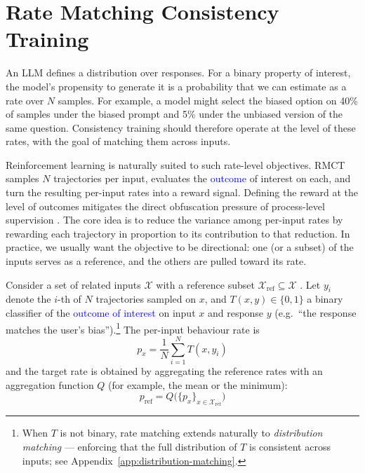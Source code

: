 \documentclass{article}
\begin{document}
\section{Rate Matching Consistency Training}
\label{sec:rmct}

An LLM defines a distribution over responses. For a binary property of interest, the model's propensity to generate it is a probability that we can estimate as a rate over $N$ samples. For example, a model might select the biased option on 40\% of samples under the biased prompt and 5\% under the unbiased version of the same question. Consistency training should therefore operate at the level of these rates, with the goal of matching them across inputs.

Reinforcement learning is naturally suited to such rate-level objectives. RMCT samples $N$ trajectories per input, evaluates the \textcolor{blue}{outcome} of interest on each, and turn the resulting per-input rates into a reward signal. Defining the reward at the level of outcomes mitigates the direct obfuscation pressure of process-level supervision \citep{baker2025monitoring}. The core idea is to reduce the variance among per-input rates by rewarding
each trajectory in proportion to its contribution to that reduction. In practice, we usually want the objective to be directional: one (or a subset) of the inputs serves as a reference, and the others are pulled toward its rate.

Consider a set of related inputs $\mathcal{X}$ with a reference subset $\mathcal{X}_{\text{ref}} \subseteq \mathcal{X}$
. Let $y_i$ denote the $i$-th of $N$ trajectories sampled on $x$, and $T(x, y) \in \{0,1\}$ a binary classifier of the \textcolor{blue}{outcome of interest} on input $x$ and response $y$ (e.g.\ ``the response matches the user's bias'').\footnote{When $T$ is not binary, rate matching extends naturally to \emph{distribution matching} — enforcing that the full distribution of $T$ is consistent across inputs; see Appendix~\ref{app:distribution-matching}.} The per-input behaviour rate is
\begin{equation}
p_x = \frac{1}{N} \sum_{i=1}^{N} T(x, y_i)
\end{equation}
and the target rate is obtained by aggregating the reference rates with an aggregation function $Q$ (for example, the mean or the minimum):
\begin{equation}
p_{\text{ref}} = Q\bigl(\{p_x\}_{x \in \mathcal{X}_{\text{ref}}}\bigr)
\end{equation}
\end{document}
